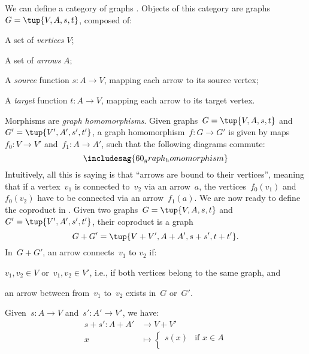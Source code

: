 \begin{example}
    We can define a category of graphs \iindex{\Graph}. Objects of this category are graphs~$G=\tup{V,A,s,t}$, composed of:
    \begin{compactitem}
        \item A set of \emph{vertices} $V$;
        \item A set of \emph{arrows} $A$;
        \item A \emph{source} function $s\colon A\to V$, mapping each arrow to its source vertex;
        \item A \emph{target} function $t\colon A\to V$, mapping each arrow to its target vertex.
    \end{compactitem}
    Morphisms are \emph{graph homomorphisms}. Given graphs~$G=\tup{V,A,s,t}$ and~$G'=\tup{V',A',s',t'}$, a graph homomorphism~$f\colon G\to G'$ is given by maps~$f_0\colon V\to V'$ and~$f_1\colon A\to A'$, such that the following diagrams commute:
    \begin{equation*}
        \includesag{60_graph_homomorphism}
    \end{equation*}
    Intuitively, all this is saying is that ``arrows are bound to their vertices'', meaning that if a vertex~$v_1$ is connected to~$v_2$ via an arrow~$a$, the vertices~$f_0(v_1)$ and~$f_0(v_2)$ have to be connected via an arrow~$f_1(a)$. We are now ready to define the coproduct in \Graph. Given two graphs~$G=\tup{V,A,s,t}$ and~$G'=\tup{V',A',s',t'}$, their coproduct is a graph
    \begin{equation*}
        G+G'=\tup{V+V',A+A',s+s',t+t'}.
    \end{equation*}
    In~$G+G'$, an arrow connects~$v_1$ to $v_2$ if:
    \begin{compactitem}
        \item $v_1,v_2\in V$ or~$v_1,v_2\in V'$, i.e., if both vertices belong to the same graph, and
        \item an arrow between from~$v_1$ to~$v_2$ exists in~$G$ or~$G'$.
    \end{compactitem}
    Given~$s\colon A\to V$ and~$s'\colon A'\to V'$, we have:
    \begin{equation*}
        \begin{aligned}
            s+ s'\colon A+ A'&\to V+ V'\\
            x&\mapsto
            \begin{cases}
                s(x)& \text{if } x\in A\\

\end{cases}
\end{aligned}
\end{equation*}
\end{example}
